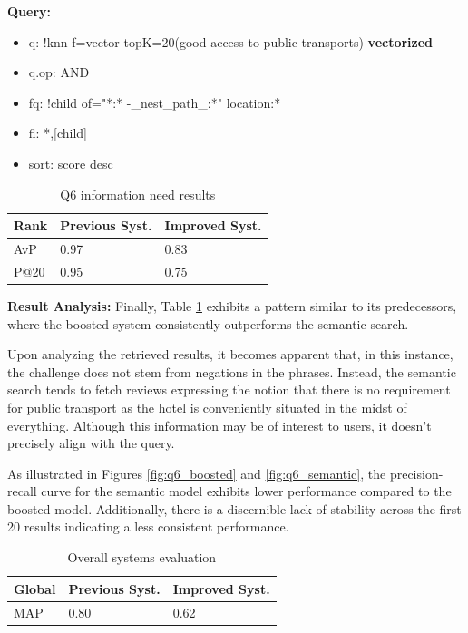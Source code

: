 \documentclass[sigconf]{acmart}
\begin{document}
\textbf{Query:}

\begin{itemize}
    \item q: {!knn f=vector topK=20}(good access to public transports) \textbf{vectorized}
    \item q.op: AND
    \item fq: {!child of="*:* -\_nest\_path\_:*"} location:*
    \item fl: *,[child]
    \item sort: score desc
\end{itemize}

\begin{table}[H]
\caption{Q6 information need results}
\label{tab:q10}
\begin{tabular}{lll}
\toprule
Rank & Previous Syst. & Improved Syst.\\
\midrule
AvP & 0.97 & 0.83  \\
P@20 & 0.95 & 0.75 \\
\bottomrule
\end{tabular}
\end{table}

\textbf{Result Analysis:} Finally, Table \ref{tab:q10} exhibits a pattern similar to its predecessors, where the boosted system consistently outperforms the semantic search.

Upon analyzing the retrieved results, it becomes apparent that, in this instance, the challenge does not stem from negations in the phrases. Instead, the semantic search tends to fetch reviews expressing the notion that there is no requirement for public transport as the hotel is conveniently situated in the midst of everything. Although this information may be of interest to users, it doesn't precisely align with the query.

As illustrated in Figures \ref{fig:q6_boosted} and \ref{fig:q6_semantic}, the precision-recall curve for the semantic model exhibits lower performance compared to the boosted model. Additionally, there is a discernible lack of stability across the first 20 results indicating a less consistent performance.


\begin{table}[H]
\caption{Overall systems evaluation}
\label{tab:map_semantic}
\begin{tabular}{lll}
\toprule
Global & Previous Syst. & Improved Syst.\\
\midrule
MAP & 0.80 & 0.62  \\ 

\bottomrule
\end{tabular}
\end{table}
\end{document}
